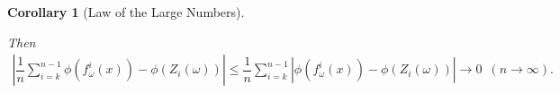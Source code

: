 \documentclass[a4paper]{article}
\theoremstyle{plain}
\newtheorem{corollary}[theorem]{Corollary}
\theoremstyle{definition}
\begin{document}
\begin{corollary}[Law of the Large Numbers]
\begin{itemize}
    Then 
            \begin{align*}
\left| \dfrac{1}{n} \sum_{i=k}^{n-1} \phi (f^{i}_{\omega}(x) ) - \phi (Z_i(\omega) )  \right|
\leq 
\dfrac{1}{n} \sum_{i=k}^{n-1} \left| \phi (f^{i}_{\omega}(x) ) - \phi (Z_i(\omega) )\right| \to 0  \,\,\,(n \to \infty).
    \end{align*}
    
    \end{itemize}
    \end{corollary}
    
\end{document}
